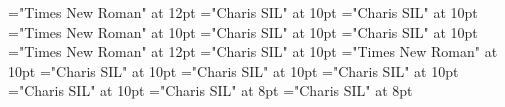 \documentclass[a4paper]{article}
\begin{document}
 
\pagestyle{plain} 
\font\scrBookscrBody="Times New Roman" at 12pt
\font\LinebscrBookscrBody="Charis SIL" at 10pt
\font\spanbgtLinebscrBookscrBody="Charis SIL" at 10pt
\font\VerseNumberbgtLinebscrBookscrBody="Times New Roman" at 10pt
\font\ParagraphContinuationscrBookscrBody="Charis SIL" at 10pt
\font\spanbgtParagraphContinuationscrBookscrBody="Charis SIL" at 10pt
\font\scrSectionscrBody="Times New Roman" at 12pt
\font\ParagraphContinuationscrSectionscrBody="Charis SIL" at 10pt
\font\VerseNumberbgtParagraphContinuationscrSectionscrBody="Times New Roman" at 10pt
\font\spanbgtParagraphContinuationscrSectionscrBody="Charis SIL" at 10pt
\font\LinebscrSectionscrBody="Charis SIL" at 10pt
\font\spanbgtLinebscrSectionscrBody="Charis SIL" at 10pt
\font\spanLinebscrSectionscrBody="Charis SIL" at 10pt
\font\NoteCrossHYPHENReferenceParagraphLinebscrSectionscrBody="Charis SIL" at 8pt
\font\spanbgtNoteCrossHYPHENReferenceParagraphLinebscrSectionscrBody="Charis SIL" at 8pt

\pagestyle{fancy} 
\begin{adjustwidth}{0pt}{0pt}{0pt}{0pt}{\raggedright} 
 \end{adjustwidth} 
\begin{adjustwidth}{0pt}{0pt}{0pt}{0pt}{\raggedright} 
 \end{adjustwidth} 
\begin{adjustwidth}{0pt}{0pt}{0pt}{0pt}{\raggedright} 
 \end{adjustwidth} 
\begin{adjustwidth}{0pt}{0pt}{0pt}{0pt}{\raggedright} 
 \end{adjustwidth} 

{\raggedright} 
\begin{adjustwidth}{0pt}{0pt}{0pt}{0pt}{\raggedright} 
 \end{adjustwidth} 
\begin{adjustwidth}{0pt}{0pt}{0pt}{0pt}{\raggedright} 
 \end{adjustwidth} 
\end{document}
